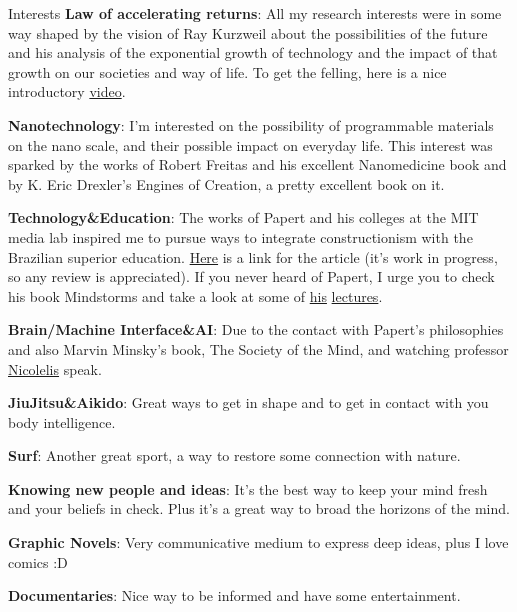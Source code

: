 \begin{rubric}{Interests}
    \entry* \textbf{Law of accelerating returns}: All my research interests were
    in some way shaped by the vision of Ray Kurzweil about the possibilities of
    the future and his analysis of the exponential growth of technology and the
    impact of that growth on our societies and way of life. To get the felling,
    here is a nice introductory
    \href{http://www.ted.com/index.php/talks/ray_kurzweil_on_how_technology_will_transform_us.html}{video}.


    \entry* \textbf{Nanotechnology}: I'm interested on the possibility of
    programmable materials on the nano scale, and their possible impact on
    everyday life. This interest was sparked by the works of Robert Freitas and
    his excellent Nanomedicine book and by K. Eric Drexler's Engines of
    Creation, a pretty excellent book on it. 

    \entry* \textbf{Technology\&Education}: The works of Papert and his colleges
    at the MIT media lab inspired me to pursue ways to integrate constructionism
    with the Brazilian superior education.
    \href{http://www.cnxs.com.br/posts/new-article-on-pedagogical-development}
    {Here} is a link for the article (it's work in progress, so any review is
    appreciated). If you never heard of Papert, I urge you to check his book
    Mindstorms and take a look at some of
    \href{http://homepage.mac.com/stager/iMovieTheater23.html}{his}
    \href{https://logothings.wikispaces.com/}{lectures}.

    \entry* \textbf{Brain/Machine Interface\&AI}: Due to the contact with
    Papert's philosophies and also Marvin Minsky's book, The Society of the
    Mind, and watching professor \href{http://www.nicolelislab.net/}{Nicolelis}
    speak.

    \entry* \textbf{JiuJitsu\&Aikido}: Great ways to get in shape and to get in
        contact with you body intelligence.

    \entry* \textbf{Surf}: Another great sport, a way to restore some connection
    with nature.

    \entry* \textbf{Knowing new people and ideas}: It's the best way to keep
    your mind fresh and your beliefs in check. Plus it's a great way to broad
    the horizons of the mind.

    \entry* \textbf{Graphic Novels}: Very communicative medium to express deep
    ideas, plus I love comics :D

    \entry* \textbf{Documentaries}: Nice way to be informed and have some
    entertainment. 

\end{rubric}


